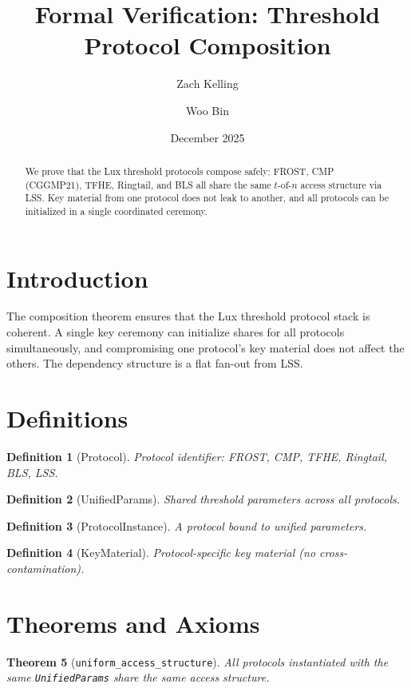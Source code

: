 \documentclass[11pt]{article}
\title{Formal Verification: Threshold Protocol Composition}
\author{Zach Kelling \and Woo Bin}
\date{December 2025}
\newtheorem{theorem}{Theorem}
\newtheorem{definition}[theorem]{Definition}
\begin{document}
\maketitle

\begin{abstract}
We prove that the Lux threshold protocols compose safely: FROST, CMP (CGGMP21), TFHE, Ringtail, and BLS all share the same $t$-of-$n$ access structure via LSS. Key material from one protocol does not leak to another, and all protocols can be initialized in a single coordinated ceremony.
\end{abstract}

\section{Introduction}
The composition theorem ensures that the Lux threshold protocol stack is coherent. A single key ceremony can initialize shares for all protocols simultaneously, and compromising one protocol's key material does not affect the others. The dependency structure is a flat fan-out from LSS.

\section{Definitions}
\begin{definition}[Protocol]
Protocol identifier: FROST, CMP, TFHE, Ringtail, BLS, LSS.
\end{definition}

\begin{definition}[UnifiedParams]
Shared threshold parameters across all protocols.
\end{definition}

\begin{definition}[ProtocolInstance]
A protocol bound to unified parameters.
\end{definition}

\begin{definition}[KeyMaterial]
Protocol-specific key material (no cross-contamination).
\end{definition}


\section{Theorems and Axioms}
\begin{theorem}[\texttt{uniform\_access\_structure}]
All protocols instantiated with the same \texttt{UnifiedParams} share the same access structure.
\end{theorem}
\end{document}
